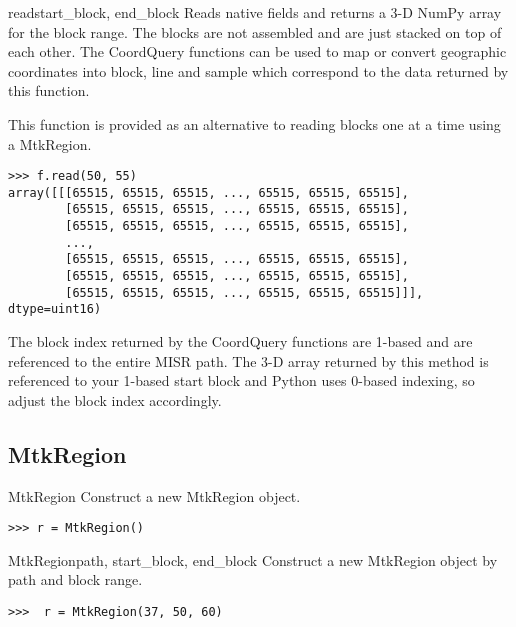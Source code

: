 \documentclass{howto}
\begin{document}
\begin{methoddesc}{read}{start_block, end_block}
  Reads native fields and returns a 3-D NumPy array for the block range. The
  blocks are not assembled and are just stacked on top of each other. The
  CoordQuery functions can be used to map or convert geographic coordinates
  into block, line and sample which correspond to the data returned by this
  function.

  This function is provided as an alternative to reading blocks one at a time
  using a MtkRegion.

\begin{verbatim}
>>> f.read(50, 55)
array([[[65515, 65515, 65515, ..., 65515, 65515, 65515],
        [65515, 65515, 65515, ..., 65515, 65515, 65515],
        [65515, 65515, 65515, ..., 65515, 65515, 65515],
        ...,
        [65515, 65515, 65515, ..., 65515, 65515, 65515],
        [65515, 65515, 65515, ..., 65515, 65515, 65515],
        [65515, 65515, 65515, ..., 65515, 65515, 65515]]], dtype=uint16)
\end{verbatim}

\begin{notice}[note]
  The block index returned by the CoordQuery functions are 1-based
  and are referenced to the entire MISR path. The 3-D array returned by this
  method is referenced to your 1-based start block and Python uses 0-based
  indexing, so adjust the block index accordingly.
\end{notice}
\end{methoddesc}


\subsection{MtkRegion \label{mtkregion}}

\begin{classdesc}{MtkRegion}{}
  Construct a new MtkRegion object.

\begin{verbatim}
>>> r = MtkRegion()
\end{verbatim}
\end{classdesc}

\begin{classdesc}{MtkRegion}{path, start_block, end_block}
  Construct a new MtkRegion object by path and block range.

\begin{verbatim}
>>>  r = MtkRegion(37, 50, 60)
\end{verbatim}
\end{classdesc}
\end{document}
